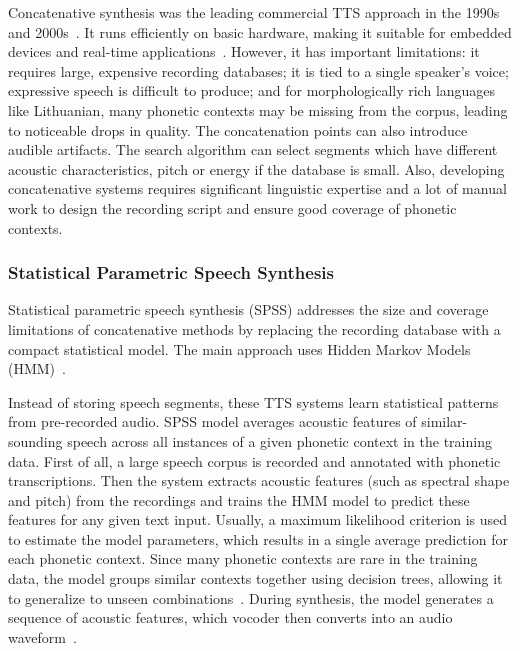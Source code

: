 \documentclass[
         english, %
    monochrome, %
]{VUMIFSEMasterThesis}
\begin{document}
Concatenative synthesis was the leading commercial TTS approach in the 1990s and 2000s~\cite{zhou2021unitnet, schwarz2006real, hunt1996unit}. It runs efficiently on basic hardware, making it suitable for embedded devices and real-time applications~\cite{chalamandaris2010unit}. However, it has important limitations: it requires large, expensive recording databases; it is tied to a single speaker's voice; expressive speech is difficult to produce; and for morphologically rich languages like Lithuanian, many phonetic contexts may be missing from the corpus, leading to noticeable drops in quality. The concatenation points can also introduce audible artifacts. The search algorithm can select segments which have different acoustic characteristics, pitch or energy if the database is small. Also, developing concatenative systems requires significant linguistic expertise and a lot of manual work to design the recording script and ensure good coverage of phonetic contexts.

\subsubsection{Statistical Parametric Speech Synthesis}

Statistical parametric speech synthesis (SPSS) addresses the size and coverage limitations of concatenative methods by replacing the recording database with a compact statistical model. The main approach uses Hidden Markov Models (HMM)~\cite{zen2009statistical, tokuda2013speech}.

Instead of storing speech segments, these TTS systems learn statistical patterns from pre-recorded audio. SPSS model averages acoustic features of similar-sounding speech across all instances of a given phonetic context in the training data. First of all, a large speech corpus is recorded and annotated with phonetic transcriptions. Then the system extracts acoustic features (such as spectral shape and pitch) from the recordings and trains the HMM model to predict these features for any given text input. Usually, a maximum likelihood criterion is used to estimate the model parameters, which results in a single average prediction for each phonetic context. Since many phonetic contexts are rare in the training data, the model groups similar contexts together using decision trees, allowing it to generalize to unseen combinations~\cite{zen2009statistical}. During synthesis, the model generates a sequence of acoustic features, which vocoder then converts into an audio waveform~\cite{tokuda2013speech}.
\end{document}
